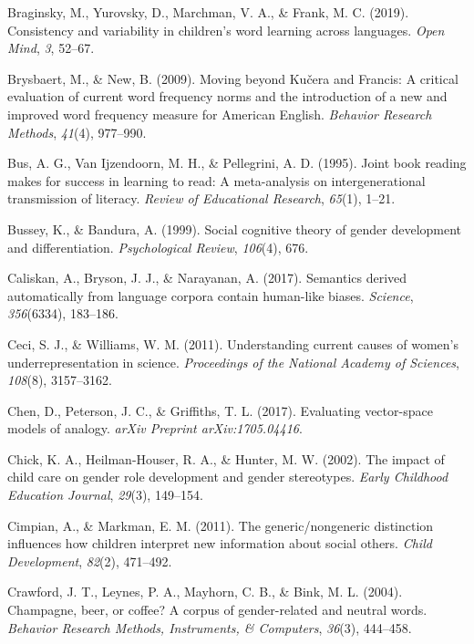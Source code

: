 \documentclass[english,,man,floatsintext]{apa6}
\begin{document}
\leavevmode\hypertarget{ref-braginsky2019consistency}{}%
Braginsky, M., Yurovsky, D., Marchman, V. A., \& Frank, M. C. (2019). Consistency and variability in children's word learning across languages. \emph{Open Mind}, \emph{3}, 52--67.

\leavevmode\hypertarget{ref-brysbaert2009moving}{}%
Brysbaert, M., \& New, B. (2009). Moving beyond Kučera and Francis: A critical evaluation of current word frequency norms and the introduction of a new and improved word frequency measure for American English. \emph{Behavior Research Methods}, \emph{41}(4), 977--990.

\leavevmode\hypertarget{ref-bus1995joint}{}%
Bus, A. G., Van Ijzendoorn, M. H., \& Pellegrini, A. D. (1995). Joint book reading makes for success in learning to read: A meta-analysis on intergenerational transmission of literacy. \emph{Review of Educational Research}, \emph{65}(1), 1--21.

\leavevmode\hypertarget{ref-bussey1999social}{}%
Bussey, K., \& Bandura, A. (1999). Social cognitive theory of gender development and differentiation. \emph{Psychological Review}, \emph{106}(4), 676.

\leavevmode\hypertarget{ref-caliskan2017semantics}{}%
Caliskan, A., Bryson, J. J., \& Narayanan, A. (2017). Semantics derived automatically from language corpora contain human-like biases. \emph{Science}, \emph{356}(6334), 183--186.

\leavevmode\hypertarget{ref-ceci2011understanding}{}%
Ceci, S. J., \& Williams, W. M. (2011). Understanding current causes of women's underrepresentation in science. \emph{Proceedings of the National Academy of Sciences}, \emph{108}(8), 3157--3162.

\leavevmode\hypertarget{ref-chen2017evaluating}{}%
Chen, D., Peterson, J. C., \& Griffiths, T. L. (2017). Evaluating vector-space models of analogy. \emph{arXiv Preprint arXiv:1705.04416}.

\leavevmode\hypertarget{ref-chick2002impact}{}%
Chick, K. A., Heilman-Houser, R. A., \& Hunter, M. W. (2002). The impact of child care on gender role development and gender stereotypes. \emph{Early Childhood Education Journal}, \emph{29}(3), 149--154.

\leavevmode\hypertarget{ref-cimpian2011generic}{}%
Cimpian, A., \& Markman, E. M. (2011). The generic/nongeneric distinction influences how children interpret new information about social others. \emph{Child Development}, \emph{82}(2), 471--492.

\leavevmode\hypertarget{ref-crawford2004champagne}{}%
Crawford, J. T., Leynes, P. A., Mayhorn, C. B., \& Bink, M. L. (2004). Champagne, beer, or coffee? A corpus of gender-related and neutral words. \emph{Behavior Research Methods, Instruments, \& Computers}, \emph{36}(3), 444--458.
\end{document}

